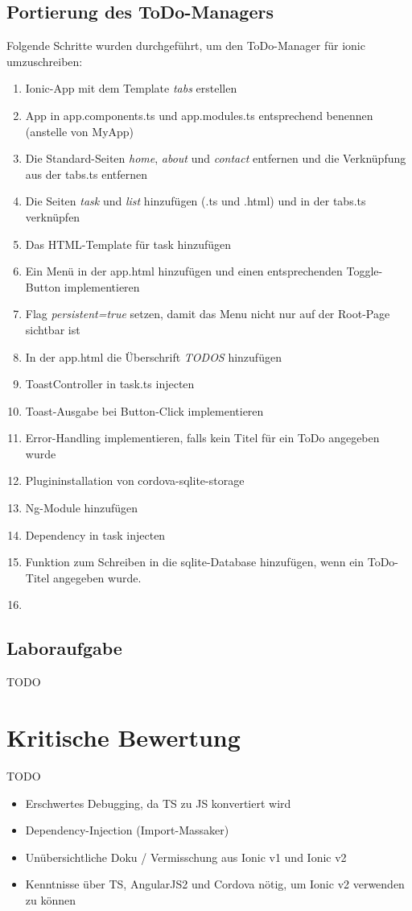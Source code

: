 \documentclass[german]{lni}
\begin{document}
\subsection{Portierung des ToDo-Managers}
Folgende Schritte wurden durchgeführt, um den ToDo-Manager für ionic umzuschreiben:
\begin{enumerate}
	\item Ionic-App mit dem Template \emph{tabs} erstellen
	\item App in app.components.ts und app.modules.ts entsprechend benennen (anstelle von MyApp)
	\item Die Standard-Seiten \emph{home}, \emph{about} und \emph{contact} entfernen und die Verknüpfung aus der tabs.ts entfernen
	\item Die Seiten \emph{task} und \emph{list} hinzufügen (.ts und .html) und in der tabs.ts verknüpfen
	\item Das HTML-Template für task hinzufügen
	\item Ein Menü in der app.html hinzufügen und einen entsprechenden Toggle-Button implementieren
	\item Flag \emph{persistent=true} setzen, damit das Menu nicht nur auf der Root-Page sichtbar ist
	\item In der app.html die Überschrift \emph{TODOS} hinzufügen
	\item ToastController in task.ts injecten
	\item Toast-Ausgabe bei Button-Click implementieren
	\item Error-Handling implementieren, falls kein Titel für ein ToDo angegeben wurde
	\item Plugininstallation von cordova-sqlite-storage	
	\item Ng-Module hinzufügen
	\item Dependency in task injecten
	\item Funktion zum Schreiben in die sqlite-Database hinzufügen, wenn ein ToDo-Titel angegeben wurde.
	\item 
\end{enumerate}

\subsection{Laboraufgabe}
TODO
\section{Kritische Bewertung}
TODO
\begin{itemize}
	
	\item Erschwertes Debugging, da TS zu JS konvertiert wird
	\item Dependency-Injection (Import-Massaker)
	\item Unübersichtliche Doku / Vermisschung aus Ionic v1 und Ionic v2
	\item Kenntnisse über TS, AngularJS2 und Cordova nötig, um Ionic v2 verwenden zu können
\end{itemize}

%
\end{document}
